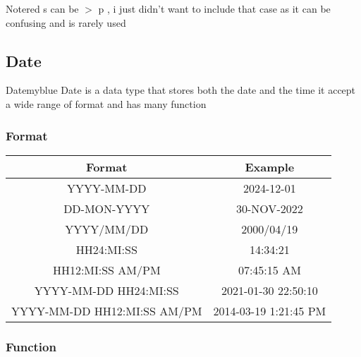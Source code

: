 \begin{prettyBox}{Note}{red}
s can be \(>\) p , i just didn't want to include that case as it can be confusing and is rarely used
\end{prettyBox}



\subsection{Date}

\begin{prettyBox}{Date}{myblue}
Date is a data type that stores both the date and the time it accept a wide range of format
and has many function  
\end{prettyBox}


\subsubsection{Format}
\begin{center}
 \renewcommand{\arraystretch}{1.5}
    \begin{tabular}{|c|c|}
        \hline
        Format & Example\\
        \hline
        YYYY-MM-DD & 2024-12-01 \\
        \hline
        DD-MON-YYYY & 30-NOV-2022\\
        \hline
        YYYY/MM/DD & 2000/04/19\\
        \hline
        HH24:MI:SS & 14:34:21\\
        \hline
        HH12:MI:SS AM/PM & 07:45:15 AM\\
        \hline
        YYYY-MM-DD HH24:MI:SS & 2021-01-30 22:50:10\\
        \hline 
        YYYY-MM-DD HH12:MI:SS AM/PM & 2014-03-19 1:21:45 PM\\
        \hline
    \end{tabular}
\end{center}


\subsubsection{Function}

